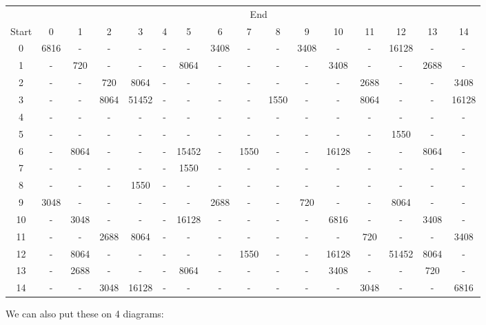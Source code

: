 \documentclass{article}
\begin{document}
\begin{center}
\begin{tabular}{c | c c c c c c c c c c c c c c c}
    & \multicolumn{15}{c}{End} \\
    Start  & 0 & 1 & 2 & 3 & 4 & 5 & 6 & 7 & 8 & 9 & 10 & 11 & 12 & 13 & 14\\
    \hline
    0 & 6816 & - & - & - & - & - & 3408 & - & - & 3408 & - & - & 16128 & - & -\\
    1 & - & 720 & - & - & - & 8064 & - & - & - & - & 3408 & - & - & 2688 & -\\
    2 & - & - & 720 & 8064 & - & - & - & - & - & - & - & 2688 & - & - & 3408\\
    3 & - & - & 8064 & 51452 & - & - & - & - & 1550 & - & - & 8064 & - & - & 16128\\
    4 & - & - & - & - & - & - & - & - & - & - & - & - & - & - & -\\
    5 & - & - & - & - & - & - & - & - & - & - & - & - & 1550 & - & -\\
    6 & - & 8064 & - & - & - & 15452 & - & 1550 & - & - & 16128 & - & - & 8064 & -\\
    7 & - & - & - & - & - & 1550 & - & - & - & - & - & - & - & - & -\\
    8 & - & - & - & 1550 & - & - & - & - & - & - & - & - & - & - & -\\
    9 & 3048 & - & - & - & - & - & 2688 & - & - & 720 & - & - & 8064 & - & -\\
    10 & - & 3048 & - & - & - & 16128 & - & - & - & - & 6816 & - & - & 3408 & -\\
    11 & - & - & 2688 & 8064 & - & - & - & - & - & - & - & 720 & - & - & 3408\\
    12 & - & 8064 & - & - & - & - & - & 1550 & - & - & 16128 & - & 51452 & 8064 & -\\
    13 & - & 2688 & - & - & - & 8064 & - & - & - & - & 3408 & - & - & 720 & -\\
    14 & - & - & 3048 & 16128 & - & - & - & - & - & - & - & 3048 & - & - & 6816
\end{tabular}
\end{center}
    
We can also put these on 4 diagrams:
\end{document}
